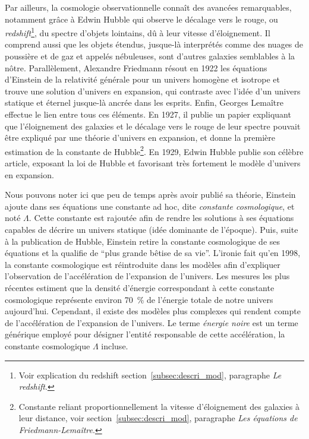 \documentclass[11pt, twoside, a4paper, openright]{report}
\begin{document}
Par ailleurs, la cosmologie observationnelle connaît des avancées remarquables, notamment grâce à Edwin Hubble qui observe le décalage vers le rouge, ou \emph{redshift}\footnote{Voir explication du redshift section~\ref{subsec:descri_mod}, paragraphe \emph{Le redshift}.}, du spectre d'objets lointains, dû à leur vitesse d'éloignement. Il comprend aussi que les objets étendus, jusque-là interprétés comme des nuages de poussière et de gaz et appelés nébuleuses, sont d'autres galaxies semblables à la nôtre. Parallèlement, Alexandre Friedmann résout en 1922 les équations d'Einstein de la relativité générale pour un univers homogène et isotrope et trouve une solution d'univers en expansion, qui contraste avec l'idée d'un univers statique et éternel jusque-là ancrée dans les esprits. Enfin, Georges Lemaître effectue le lien entre tous ces éléments. En 1927, il publie un papier expliquant que l'éloignement des galaxies et le décalage vers le rouge de leur spectre pouvait être expliqué par une théorie d'univers en expansion, et donne la première estimation de la constante de Hubble\footnote{Constante reliant proportionnellement la vitesse d'éloignement des galaxies à leur distance, voir section~\ref{subsec:descri_mod}, paragraphe \emph{Les équations de Friedmann-Lemaître}.}. En 1929, Edwin Hubble publie son célèbre article, exposant la loi de Hubble et favorisant très fortement le modèle d'univers en expansion.

Nous pouvons noter ici que peu de temps après avoir publié sa théorie, Einstein ajoute dans ses équations une constante ad hoc, dite \emph{constante cosmologique}, et noté $\Lambda$. Cette constante est rajoutée afin de rendre les solutions à ses équations capables de décrire un univers statique (idée dominante de l'époque). Puis, suite à la publication de Hubble, Einstein retire la constante cosmologique de ses équations et la qualifie de ``plus grande bêtise de sa vie''. L'ironie fait qu'en 1998, la constante cosmologique est réintroduite dans les modèles afin d'expliquer l'observation de l'accélération de l'expansion de l'univers. Les mesures les plus récentes estiment que la densité d'énergie correspondant à cette constante cosmologique représente environ \SI{70}{\percent} de l'énergie totale de notre univers aujourd'hui. Cependant, il existe des modèles plus complexes qui rendent compte de l'accélération de l'expansion de l'univers. Le terme \emph{énergie noire} est un terme générique employé pour désigner l'entité responsable de cette accélération, la constante cosmologique $\Lambda$ incluse.
\end{document}

